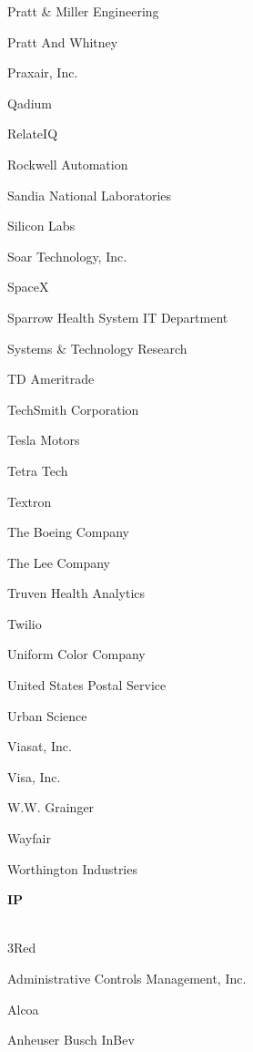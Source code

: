 \documentclass[twoside]{article}
\begin{document}
\begin{center}
\begin{multicols}{5}
\begin{FlushLeft}
\begin{compactitem}
\item Pratt \& Miller Engineering
\item Pratt And Whitney
\item Praxair, Inc.
\item Qadium
\item RelateIQ
\item Rockwell Automation
\item Sandia National Laboratories
\item Silicon Labs
\item Soar Technology, Inc.
\item SpaceX
\item Sparrow Health System IT Department
\item Systems \& Technology Research
\item TD Ameritrade
\item TechSmith Corporation
\item Tesla Motors
\item Tetra Tech
\item Textron
\item The Boeing Company
\item The Lee Company
\item Truven Health Analytics
\item Twilio
\item Uniform Color Company
\item United States Postal Service
\item Urban Science
\item Viasat, Inc.
\item Visa, Inc.
\item W.W. Grainger
\item Wayfair
\item Worthington Industries
\end{compactitem}
        \end{FlushLeft}
        \vspace{1em}
        {\fontsize{14}{16}\selectfont \bf IP}\\
        \vspace{-1em}
        ~\hrulefill~
        \vspace{-.9em}
        \begin{FlushLeft}
        \begin{compactitem}
        \item 3Red
\item Administrative Controls Management, Inc.
\item Alcoa
\item Anheuser Busch InBev

\end{compactitem}
\end{FlushLeft}
\end{multicols}
\end{center}
\end{document}
